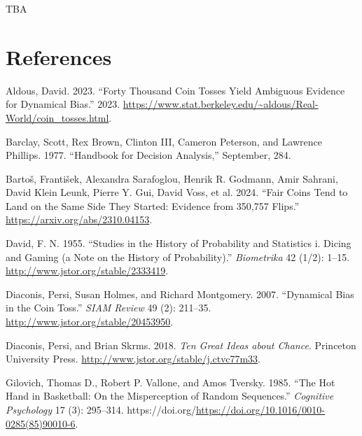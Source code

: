 \documentclass[
  letterpaper,
  DIV=11,
  numbers=noendperiod]{scrreprt}
\newlength{\cslhangindent}
\newenvironment{CSLReferences}[2] %
 {\begin{list}{}{%
  \setlength{\itemindent}{0pt}
  \setlength{\leftmargin}{0pt}
  \setlength{\parsep}{0pt}
  \ifodd #1
   \setlength{\leftmargin}{\cslhangindent}
   \setlength{\itemindent}{-1\cslhangindent}
  \fi
  \setlength{\itemsep}{#2\baselineskip}}}
 {\end{list}}
\theoremstyle{plain}
\theoremstyle{definition}
\theoremstyle{definition}
\theoremstyle{definition}
\theoremstyle{remark}
\begin{document}

\cleardoublepage

TBA


\chapter*{References}\label{references}


\label{refs}
\begin{CSLReferences}{1}{0}
Aldous, David. 2023. {``Forty Thousand Coin Tosses Yield Ambiguous
Evidence for Dynamical Bias.''} 2023.
\url{https://www.stat.berkeley.edu/~aldous/Real-World/coin_tosses.html}.

Barclay, Scott, Rex Brown, Clinton III, Cameron Peterson, and Lawrence
Phillips. 1977. {``Handbook for Decision Analysis,''} September, 284.

Bartoš, František, Alexandra Sarafoglou, Henrik R. Godmann, Amir
Sahrani, David Klein Leunk, Pierre Y. Gui, David Voss, et al. 2024.
{``Fair Coins Tend to Land on the Same Side They Started: Evidence from
350,757 Flips.''} \url{https://arxiv.org/abs/2310.04153}.

David, F. N. 1955. {``Studies in the History of Probability and
Statistics i. Dicing and Gaming (a Note on the History of
Probability).''} \emph{Biometrika} 42 (1/2): 1--15.
\url{http://www.jstor.org/stable/2333419}.

Diaconis, Persi, Susan Holmes, and Richard Montgomery. 2007.
{``Dynamical Bias in the Coin Toss.''} \emph{SIAM Review} 49 (2):
211--35. \url{http://www.jstor.org/stable/20453950}.

Diaconis, Persi, and Brian Skrms. 2018. \emph{Ten Great Ideas about
Chance}. Princeton University Press.
\url{http://www.jstor.org/stable/j.ctvc77m33}.

Gilovich, Thomas D., Robert P. Vallone, and Amos Tversky. 1985. {``The
Hot Hand in Basketball: On the Misperception of Random Sequences.''}
\emph{Cognitive Psychology} 17 (3): 295--314.
https://doi.org/\url{https://doi.org/10.1016/0010-0285(85)90010-6}.


\end{CSLReferences}
\end{document}
